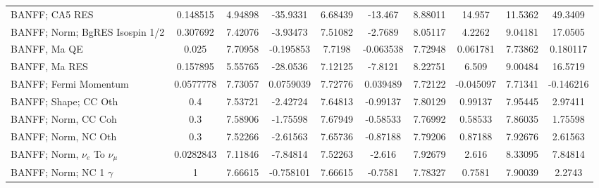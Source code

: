 \begin{tabular}{| l | S | S  S | S  S | S  S | S  S | }
                                                                  BANFF; CA5 RES &        0.148515 &         4.94898 &        -35.9331 &         6.68439 &         -13.467 &         8.88011 &          14.957 &         11.5362 &         49.3409 \\ 
                                                  BANFF; Norm; BgRES Isospin 1/2 &        0.307692 &         7.42076 &        -3.93473 &         7.51082 &         -2.7689 &         8.05117 &          4.2262 &         9.04181 &         17.0505 \\ 
                                                                    BANFF, Ma QE &           0.025 &         7.70958 &       -0.195853 &          7.7198 &       -0.063538 &         7.72948 &        0.061781 &         7.73862 &        0.180117 \\ 
                                                                   BANFF, Ma RES &        0.157895 &         5.55765 &        -28.0536 &         7.12125 &         -7.8121 &         8.22751 &           6.509 &         9.00484 &         16.5719 \\ 
                                                           BANFF; Fermi Momentum &       0.0577778 &         7.73057 &       0.0759039 &         7.72776 &        0.039489 &         7.72122 &       -0.045097 &         7.71341 &       -0.146216 \\ 
                                                            BANFF; Shape; CC Oth &             0.4 &         7.53721 &        -2.42724 &         7.64813 &        -0.99137 &         7.80129 &         0.99137 &         7.95445 &         2.97411 \\ 
                                                             BANFF; Norm, CC Coh &             0.3 &         7.58906 &        -1.75598 &         7.67949 &        -0.58533 &         7.76992 &         0.58533 &         7.86035 &         1.75598 \\ 
                                                             BANFF; Norm, NC Oth &             0.3 &         7.52266 &        -2.61563 &         7.65736 &        -0.87188 &         7.79206 &         0.87188 &         7.92676 &         2.61563 \\ 
                                           BANFF; Norm, $\nu_{e}$ To $\nu_{\mu}$ &       0.0282843 &         7.11846 &        -7.84814 &         7.52263 &          -2.616 &         7.92679 &           2.616 &         8.33095 &         7.84814 \\ 
                                                      BANFF; Norm; NC 1 $\gamma$ &               1 &         7.66615 &       -0.758101 &         7.66615 &         -0.7581 &         7.78327 &          0.7581 &         7.90039 &          2.2743 \\ 

\end{tabular}
